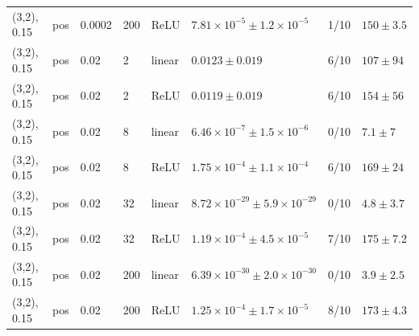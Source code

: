 \begin{table}[t]
\begin{tabular}{llllllll}
(3,2), 0.15 & pos & 0.0002 & 200 & ReLU & $7.81\times10^{-5}\pm1.2\times10^{-5}$ & 1/10 & $150\pm3.5$ \\
(3,2), 0.15 & pos & 0.02 & 2 & linear & $0.0123\pm0.019$ & 6/10 & $107\pm94$ \\
(3,2), 0.15 & pos & 0.02 & 2 & ReLU & $0.0119\pm0.019$ & 6/10 & $154\pm56$ \\
(3,2), 0.15 & pos & 0.02 & 8 & linear & $6.46\times10^{-7}\pm1.5\times10^{-6}$ & 0/10 & $7.1\pm7$ \\
(3,2), 0.15 & pos & 0.02 & 8 & ReLU & $1.75\times10^{-4}\pm1.1\times10^{-4}$ & 6/10 & $169\pm24$ \\
(3,2), 0.15 & pos & 0.02 & 32 & linear & $8.72\times10^{-29}\pm5.9\times10^{-29}$ & 0/10 & $4.8\pm3.7$ \\
(3,2), 0.15 & pos & 0.02 & 32 & ReLU & $1.19\times10^{-4}\pm4.5\times10^{-5}$ & 7/10 & $175\pm7.2$ \\
(3,2), 0.15 & pos & 0.02 & 200 & linear & $6.39\times10^{-30}\pm2.0\times10^{-30}$ & 0/10 & $3.9\pm2.5$ \\
(3,2), 0.15 & pos & 0.02 & 200 & ReLU & $1.25\times10^{-4}\pm1.7\times10^{-5}$ & 8/10 & $173\pm4.3$ \\
\bottomrule
\end{tabular}
\end{table}
